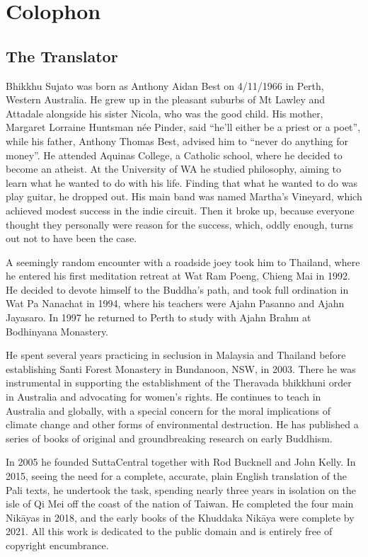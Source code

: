 \documentclass[12pt,openany]{book}%
\let\oldbackmatter\backmatter
\renewcommand{\backmatter}{%
\chapterfont{\setstretch{.85}\normalfont\centering}%
\sectionfont{\setstretch{.85}\Semiboldsubheadfont}%
\oldbackmatter}
\begin{document}
%
\backmatter%
\chapter*{Colophon}

\section*{The Translator}

Bhikkhu Sujato was born as Anthony Aidan Best on 4/11/1966 in Perth, Western Australia. He grew up in the pleasant suburbs of Mt Lawley and Attadale alongside his sister Nicola, who was the good child. His mother, Margaret Lorraine Huntsman née Pinder, said “he’ll either be a priest or a poet”, while his father, Anthony Thomas Best, advised him to “never do anything for money”. He attended Aquinas College, a Catholic school, where he decided to become an atheist. At the University of WA he studied philosophy, aiming to learn what he wanted to do with his life. Finding that what he wanted to do was play guitar, he dropped out. His main band was named Martha’s Vineyard, which achieved modest success in the indie circuit. Then it broke up, because everyone thought they personally were reason for the success, which, oddly enough, turns out not to have been the case. 

A seemingly random encounter with a roadside joey took him to Thailand, where he entered his first meditation retreat at Wat Ram Poeng, Chieng Mai in 1992. He decided to devote himself to the Buddha’s path, and took full ordination in Wat Pa Nanachat in 1994, where his teachers were Ajahn Pasanno and Ajahn Jayasaro. In 1997 he returned to Perth to study with Ajahn Brahm at Bodhinyana Monastery. 

He spent several years practicing in seclusion in Malaysia and Thailand before establishing Santi Forest Monastery in Bundanoon, NSW, in 2003. There he was instrumental in supporting the establishment of the Theravada bhikkhuni order in Australia and advocating for women’s rights. He continues to teach in Australia and globally, with a special concern for the moral implications of climate change and other forms of environmental destruction. He has published a series of books of original and groundbreaking research on early Buddhism. 

In 2005 he founded SuttaCentral together with Rod Bucknell and John Kelly. In 2015, seeing the need for a complete, accurate, plain English translation of the Pali texts, he undertook the task, spending nearly three years in isolation on the isle of Qi Mei off the coast of the nation of Taiwan. He completed the four main \textsanskrit{Nikāyas} in 2018, and the early books of the Khuddaka \textsanskrit{Nikāya} were complete by 2021. All this work is dedicated to the public domain and is entirely free of copyright encumbrance. 
\end{document}
